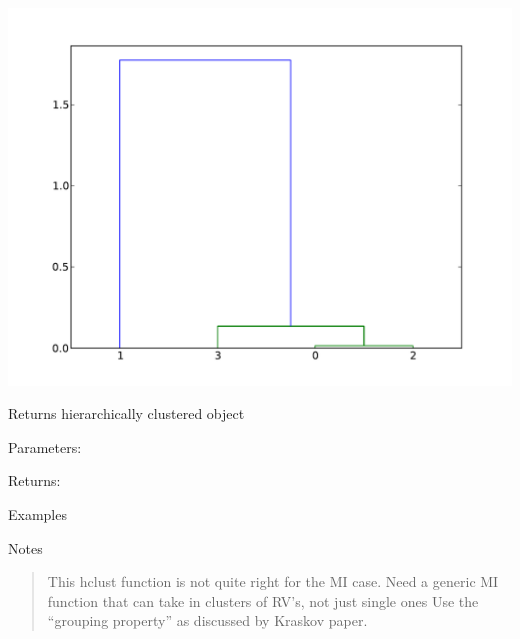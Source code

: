 \documentclass[letterpaper,10pt,english]{sphinxmanual}
\begin{document}
\begin{fulllineitems}
\label{index:halla.hierarchy.hclust}~
\includegraphics{index-1.pdf}

Returns hierarchically clustered object

Parameters:

Returns:

Examples

Notes
\begin{quote}

This hclust function is not quite right for the MI case. Need a generic MI function that can take in clusters of RV's, not just single ones 
Use the ``grouping property'' as discussed by Kraskov paper.
\end{quote}

\end{fulllineitems}

\end{document}
